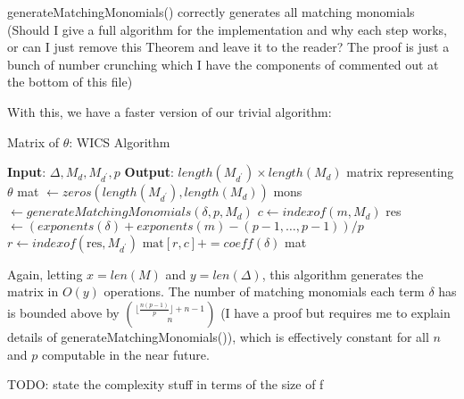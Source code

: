 \begin{thm}
    generateMatchingMonomials() correctly generates all matching monomials (Should I give a full algorithm for the implementation and why each step works, or can I just remove this Theorem and leave it to the reader? The proof is just a bunch of number crunching which I have the components of commented out at the bottom of this file)
\end{thm}

With this, we have a faster version of our trivial algorithm:

\begin{algorithm}[H]
    \caption{Matrix of $\theta$: WICS Algorithm}
    \label{alg:matrix:WICS}
    \begin{algorithmic}[1]
    \State \textbf{Input}: $\Delta, M_{d}, M_{d^{\prime}}, p$
    \State \textbf{Output}: $length(M_{d^{\prime}}) \times length(M_{d})$ matrix representing $\theta$
    \State mat $\gets zeros(length(M_{d^{\prime}}), length(M_{d}))$
    \For{$\delta \in \Delta$}
        \State mons $\gets generateMatchingMonomials(\delta, p, M_{d})$
		    \State $c \gets indexof(m,M_{d})$
			\State res $\gets (exponents(\delta) + exponents(m) - (p-1, \ldots, p-1)) / p$
			\State $r \gets indexof(\text{res},M_{d^{\prime}})$
            \State $\text{mat}[r, c] += coeff(\delta)$
        \EndFor
    \EndFor
    \State \Return mat
    \end{algorithmic}
\end{algorithm}

Again, letting $x = len(M)$ and $y = len(\Delta)$, this algorithm generates the matrix in $O(y)$ operations. The number of matching monomials each term $\delta$ has is bounded above by $\binom{\lfloor \frac{n(p - 1)}{p} \rfloor + n - 1}{n}$ (I have a proof but requires me to explain details of generateMatchingMonomials()), which is effectively constant for all $n$ and $p$ computable in the near future.

TODO: state the complexity stuff in terms of the size of f


